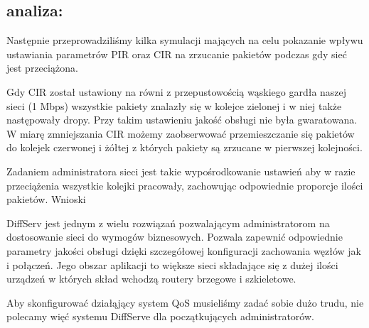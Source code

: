 \documentclass[a4paper]{article}
\begin{document}
\subsection{analiza:}


Następnie przeprowadziliśmy kilka symulacji mających na celu pokazanie wpływu ustawiania parametrów PIR oraz CIR na zrzucanie pakietów podczas gdy sieć jest przeciążona.

Gdy CIR został ustawiony na równi z przepustowością wąskiego gardła naszej sieci (1 Mbps) wszystkie pakiety znalazły się w kolejce zielonej i w niej także następowały dropy. Przy takim ustawieniu jakość obsługi nie była gwaratowana.
W miarę zmniejszania CIR możemy zaobserwować przemieszczanie się pakietów do kolejek czerwonej i żółtej z których pakiety są zrzucane w pierwszej kolejności.





Zadaniem administratora sieci jest takie wypośrodkowanie ustawień aby w razie przeciążenia wszystkie kolejki pracowały, zachowując odpowiednie proporcje ilości pakietów.
Wnioski


DiffServ jest jednym z wielu rozwiązań pozwalającym administratorom na dostosowanie sieci do wymogów biznesowych. Pozwala zapewnić odpowiednie parametry jakości obsługi dzięki szczegółowej konfiguracji zachowania węzłów jak i połączeń. Jego obszar aplikacji to większe sieci składające się z dużej ilości urządzeń w których skład wchodzą routery brzegowe i szkieletowe.

Aby skonfigurować działąjący system QoS musieliśmy zadać sobie dużo trudu, nie polecamy więć systemu DiffServe dla początkujących administratorów.
\end{document}
